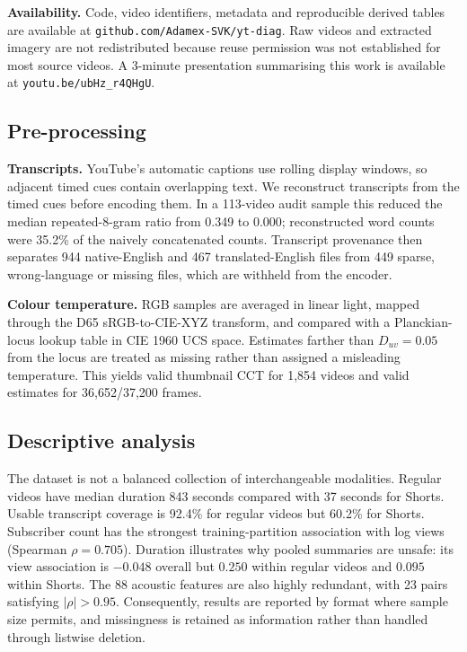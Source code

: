 \documentclass[letterpaper]{article}
\begin{document}
\textbf{Availability.} Code, video identifiers, metadata and reproducible
derived tables are available at \texttt{github.com/Adamex-SVK/yt-diag}. Raw
videos and extracted imagery are not redistributed because reuse permission was
not established for most source videos. A 3-minute presentation summarising
this work is available at \texttt{youtu.be/ubHz\_r4QHgU}.

\subsection{Pre-processing}

\textbf{Transcripts.} YouTube's automatic captions use rolling display windows,
so adjacent timed cues contain overlapping text. We reconstruct transcripts from
the timed cues before encoding them. In a 113-video audit sample this reduced
the median repeated-8-gram ratio from 0.349 to 0.000; reconstructed word counts
were 35.2\% of the naively concatenated counts. Transcript provenance then
separates 944 native-English and 467 translated-English files from 449 sparse,
wrong-language or missing files, which are withheld from the encoder.

\textbf{Colour temperature.} RGB samples are averaged in linear light, mapped
through the D65 sRGB-to-CIE-XYZ transform, and compared with a Planckian-locus
lookup table in CIE 1960 UCS space. Estimates farther than $D_{uv}=0.05$ from
the locus are treated as missing rather than assigned a misleading temperature.
This yields valid thumbnail CCT for 1{,}854 videos and valid estimates for
36{,}652/37{,}200 frames.

\subsection{Descriptive analysis}

The dataset is not a balanced collection of interchangeable modalities.
Regular videos have median duration 843 seconds compared with 37 seconds for
Shorts. Usable transcript coverage is 92.4\% for regular videos but 60.2\% for
Shorts. Subscriber count has the strongest training-partition association with
log views (Spearman $\rho=0.705$). Duration illustrates why pooled summaries are
unsafe: its view association is $-0.048$ overall but $0.250$ within regular
videos and $0.095$ within Shorts. The 88 acoustic features are also highly
redundant, with 23 pairs satisfying $|\rho|>0.95$. Consequently, results are
reported by format where sample size permits, and missingness is retained as
information rather than handled through listwise deletion.
\end{document}
